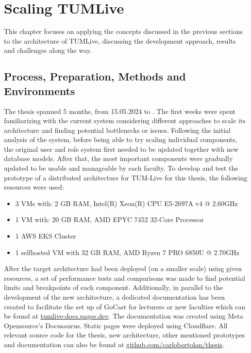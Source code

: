 
\chapter{Scaling TUMLive}\label{chapter:scaling_tumlive}

This chapter focuses on applying the concepts discussed in the previous sections to the architecture of TUMLive, discussing the development approach, results and challenges along the way. 

\section{Process, Preparation, Methods and Environments}

The thesis spanned 5 months, from 15.05.2024 to \getSubmissionDate{}. The first weeks were spent familiarizing with the current system considering different approaches to scale its architecture and finding potential bottlenecks or issues. Following the initial analysis of the system, before being able to try scaling individual components, the original user and role system first needed to be updated together with new database models. After that, the most important components were gradually updated to be usable and manageable by each faculty. 
To develop and test the prototype of a distributed architecture for TUM-Live for this thesis, the following resources were used:
\begin{itemize}
    \item 3 \ac{VM}s with: 2 GB RAM, Intel(R) Xeon(R) CPU E5-2697A v4 @ 2.60GHz
    \item 1 \ac{VM} with: 20 GB RAM, AMD EPYC 7452 32-Core Processor
    \item 1 \ac{AWS} \ac{EKS} Cluster
    \item 1 selfhosted \ac{VM} with 32 GB RAM, AMD Ryzen 7 PRO 6850U @ 2.70GHz
\end{itemize}

After the target architecture had been deployed (on a smaller scale) using given resources, a set of performance tests and comparisons was made to find potential limits and breakpoints of each component. 
Additionally, in parallel to the development of the new architecture, a dedicated documentation has been created to facilitate the set up of GoCast for lecturers or new faculties which can be found at \href{https://tumlive-docs.pages.dev/}{tumlive-docs.pages.dev}. The documentation was created using Meta Opensource's Docusaurus. Static pages were deployed using Cloudflare.
All relevant source code for the thesis, new architecture, other mentioned prototypes and documentation can also be found at \href{https://github.com/carlobortolan/thesis}{github.com/carlobortolan/thesis}.

